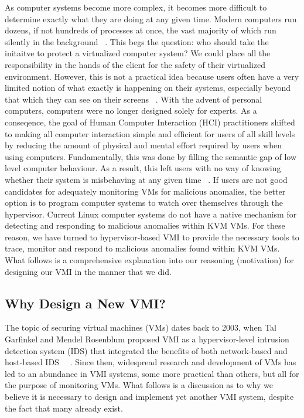 \documentclass{report}
\begin{document}
\begin{spacing}{1.5}
{\large 
As computer systems become more complex, it becomes more difficult to determine exactly what they are doing at any given time. Modern computers run dozens, if not hundreds of processes at once, the vast majority of which run silently in the background ~\cite{findlay2021practical}. This begs the question: who should take the initaitve to protect a virtualized computer system? We could place all the responsibility in the hands of the client for the safety of their virtualized environment. However, this is not a practical idea because users often have a very limited notion of what exactly is happening on their systems, especially beyond that which they can see on their screens ~\cite{findlay2021practical}. With the advent of personal computers, computers were no longer designed solely for experts. As a conseqence, the goal of Human Computer Interaction (HCI) practitioners shifted to making all computer interaction simple and efficient for users of all skill levels by reducing the amount of physical and mental effort required by users when using computers. Fundamentally, this was done by filling the semantic gap of low level computer behaviour. As a result, this left users with no way of knowing whether their system is misbehaving at any given time ~\cite{findlay2021practical}. If users are not good candidates for adequately monitoring VMs for malicious anomalies, the better option is to program computer systems to watch over themselves through the hypervisor. Current Linux computer systems do not have a native mechanism for detecting and responding to malicious anomalies within KVM VMs. For these reason, we have turned to hypervisor-based VMI to provide the necessary tools to trace, monitor and respond to malicious anomalies found within KVM VMs. What follows is a comprehensive explanation into our reasoning (motivation) for designing our VMI in the manner that we did.
\newline
}




\subsection{Why Design a New VMI?}

{\large
The topic of securing virtual machines (VMs) dates back to 2003, when Tal Garfinkel and Mendel Rosenblum proposed VMI as a hypervisor-level intrusion detection system (IDS) that integrated the benefits of both network-based and host-based IDS ~\cite{hebbal2015virtual}~\cite{somayaji2002operating}. Since then, widespread research and development of VMs has led to an abundance in VMI systems, some more practical than others, but all for the purpose of monitoring VMs. What follows is a discussion as to why we believe it is necessary to design and implement yet another VMI system, despite the fact that many already exist.
\newline
}



\end{spacing}
\end{document}
